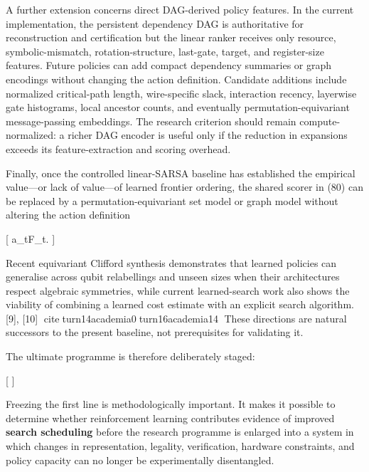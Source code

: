 \documentclass[
]{article}
\begin{document}
A further extension concerns direct DAG-derived policy features. In the
current implementation, the persistent dependency DAG is authoritative
for reconstruction and certification but the linear ranker receives only
resource, symbolic-mismatch, rotation-structure, last-gate, target, and
register-size features. Future policies can add compact dependency
summaries or graph encodings without changing the action definition.
Candidate additions include normalized critical-path length,
wire-specific slack, interaction recency, layerwise gate histograms,
local ancestor counts, and eventually permutation-equivariant
message-passing embeddings. The research criterion should remain
compute-normalized: a richer DAG encoder is useful only if the reduction
in expansions exceeds its feature-extraction and scoring overhead.

Finally, once the controlled linear-SARSA baseline has established the
empirical value---or lack of value---of learned frontier ordering, the
shared scorer in (80) can be replaced by a permutation-equivariant set
model or graph model without altering the action definition

{[} a\_t\in\mathcal F\_t.  {]}

Recent equivariant Clifford synthesis demonstrates that learned policies
can generalise across qubit relabellings and unseen sizes when their
architectures respect algebraic symmetries, while current learned-search
work also shows the viability of combining a learned cost estimate with
an explicit search algorithm. {[}9{]}, {[}10{]}
citeturn14academia0turn16academia14 These directions are natural
successors to the present baseline, not prerequisites for validating it.

The ultimate programme is therefore deliberately staged:

{[}   {]}

Freezing the first line is methodologically important. It makes it
possible to determine whether reinforcement learning contributes
evidence of improved \textbf{search scheduling} before the research
programme is enlarged into a system in which changes in representation,
legality, verification, hardware constraints, and policy capacity can no
longer be experimentally disentangled.
\end{document}
